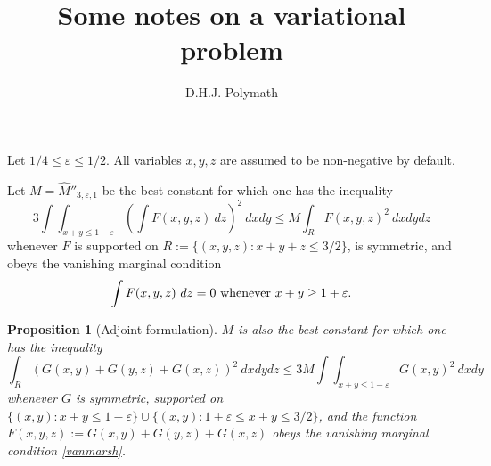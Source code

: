 \documentclass[12pt,a4paper,reqno]{amsart}
\numberwithin{equation}{section}
\theoremstyle{plain}
\newtheorem{proposition}[theorem]{Proposition}
\theoremstyle{definition}
\newcommand\eps{\varepsilon}
\begin{document}
\title{Some notes on a variational problem}

\author{D.H.J. Polymath}
\address{http://michaelnielsen.org/polymath1/index.php}


\maketitle

Let $1/4 \leq \eps \leq 1/2$.  All variables $x,y,z$ are assumed to be non-negative by default.

Let $M = \hat M''_{3,\eps,1}$ be the best constant for which one has the inequality
\begin{equation}\label{bing}
3 \int\int_{x+y \leq 1-\eps} (\int F(x,y,z)\ dz)^2\ dx dy \leq M \int_R F(x,y,z)^2\ dx dy dz
\end{equation}
whenever $F$ is supported on $R := \{ (x,y,z): x+y+z \leq 3/2\}$, is symmetric, and obeys the vanishing marginal condition
\begin{equation}\label{vanmarsh}
\int F(x,y,z)\ dz = 0 \hbox{ whenever } x+y \geq 1+\eps.
\end{equation}

\begin{proposition}[Adjoint formulation]  $M$ is also the best constant for which one has the inequality
\begin{equation}\label{bong}
\int_R (G(x,y)+G(y,z)+G(x,z))^2\ dx dy dz \leq 3M \int\int_{x+y \leq 1-\eps} G(x,y)^2\ dx dy
\end{equation}
whenever $G$ is symmetric, supported on $\{ (x,y): x+y \leq 1-\eps\} \cup \{ (x,y): 1+\eps \leq x+y \leq 3/2\}$, and the function $F(x,y,z) := G(x,y) + G(y,z) + G(x,z)$ obeys the vanishing marginal condition \eqref{vanmarsh}.
\end{proposition}
\end{document}
